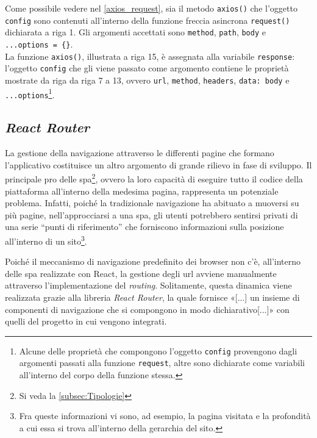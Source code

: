 Come possibile vedere nel \autoref{axios_request}, sia il metodo \texttt{axios()} che l'oggetto \texttt{config} sono contenuti all'interno della funzione freccia asincrona \texttt{request()} dichiarata a riga 1. Gli argomenti accettati sono \texttt{method}, \texttt{path}, \texttt{body} e \texttt{...options = \{\}}.\\
La funzione \texttt{axios()}, illustrata a riga 15, è assegnata alla variabile \texttt{response}: l'oggetto \texttt{config} che gli viene passato come argomento contiene le proprietà mostrate da riga da riga 7 a 13, ovvero \texttt{url}, \texttt{method}, \texttt{headers}, \texttt{data: body} e \texttt{...options}\footnote{Alcune delle proprietà che compongono l'oggetto \texttt{config} provengono dagli argomenti passati alla funzione \texttt{request}, altre sono dichiarate come variabili all'interno del corpo della funzione stessa.}.



\subsection{\textit{React Router}}
La gestione della navigazione attraverso le differenti pagine che formano l'applicativo costituisce un altro argomento di grande rilievo in fase di sviluppo. Il principale pro delle \acrshort{spa}\footnote{Si veda la \autoref{subsec:Tipologie}}, ovvero la loro capacità di eseguire tutto il codice della piattaforma all'interno della medesima pagina, rappresenta un potenziale problema. Infatti, poiché la tradizionale navigazione ha abituato a muoversi su più pagine, nell'approcciarsi a una \acrshort{spa}, gli utenti potrebbero sentirsi privati di una serie “punti di riferimento” che forniscono informazioni sulla posizione all'interno di un sito\footnote{Fra queste informazioni vi sono, ad esempio, la pagina visitata e la profondità a cui essa si trova all'interno della gerarchia del sito.}.

Poiché il meccanismo di navigazione predefinito dei browser non c'è, all'interno delle \acrshort{spa} realizzate con React, la gestione degli \gls{url} avviene manualmente attraverso l'implementazione del \textit{routing}. Solitamente, questa dinamica viene realizzata grazie alla libreria \textit{React Router}, la quale fornisce «[...] un insieme di componenti di navigazione che si compongono in modo dichiarativo[...]»\cite{Remix_ReactRouter} con quelli del progetto in cui vengono integrati.

